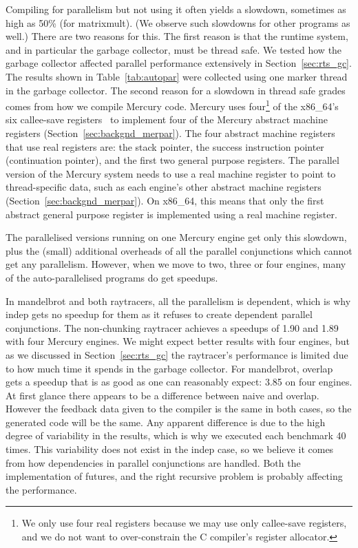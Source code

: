Compiling for parallelism but not using it
often yields a slowdown, sometimes as high as 50\% (for matrixmult).
(We observe such slowdowns for other programs as well.)
There are two reasons for this.
The first reason is that the runtime system, and in particular the garbage
collector, must be thread safe.
We tested how the garbage collector affected parallel performance
extensively in Section~\ref{sec:rts_gc}.
The results shown in Table~\ref{tab:autopar} were collected using one marker
thread in the garbage collector.
The second reason for a slowdown in thread safe grades comes from how we
compile Mercury code.
Mercury uses four\footnote{
    We only use four real registers because we may use only 
    callee-save registers,
    and we do not want to over-constrain the C compiler's register
    allocator.}
of the x86\_64's six callee-save registers~\citep{sysv-abi} to implement
four of the Mercury abstract machine registers
(Section~\ref{sec:backgnd_merpar}).
The four abstract machine registers that use real registers are:
the stack pointer,
the success instruction pointer (continuation pointer),
and the first two general purpose registers.
The parallel version of the Mercury system
needs to use a real machine register
to point to thread-specific data,
such as each engine's other abstract machine registers
(Section~\ref{sec:backgnd_merpar}).
On x86\_64, this means that only the first abstract general purpose register
is implemented using a real machine register.

The parallelised versions running on one Mercury engine get
only this slowdown,
plus the (small) additional overheads of all the parallel conjunctions
which cannot get any parallelism.
However, when we move to two, three or four engines,
many of the auto-parallelised programs do get speedups.

In mandelbrot and both raytracers,
all the parallelism is dependent,
which is why indep gets no speedup for them as it refuses to create
dependent parallel conjunctions.
The non-chunking raytracer achieves a speedups of 1.90 and 1.89 with four Mercury engines.
We might expect better results with four engines, but as we discussed in
Section~\ref{sec:rts_gc} the raytracer's performance is limited due to how
much time it spends in the garbage collector.
For mandelbrot, overlap gets a speedup
that is as good as one can reasonably expect: 3.85 on four engines.
At first glance there appears to be a difference between naive and overlap.
However the feedback data given to the compiler is the same in both cases,
so the generated code will be the same.
Any apparent difference is due to the high degree of variability in the
results,
which is why we executed each benchmark 40 times.
This variability does not exist in the indep case,
so we believe it comes from how dependencies in parallel conjunctions are
handled.
Both the implementation of futures,
and the right recursive problem is probably affecting the performance.

